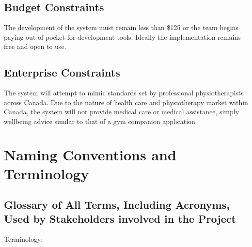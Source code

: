 \documentclass[12pt]{article}
\begin{document}
\subsection{Budget Constraints}
The development of the system must remain less than \$125 or the team begins paying out of pocket for development tools. Ideally the implementation remains free and open to use.

\subsection{Enterprise Constraints}
The system will attempt to mimic standards set by professional physiotherapists across Canada. Due to the nature of health care and physiotherapy market within Canada, the system will not provide medical care or medical assistance, simply wellbeing advice similar to that of a gym companion application.

\section{Naming Conventions and Terminology}

\subsection{Glossary of All Terms, Including Acronyms, Used by Stakeholders
involved in the Project}
Terminology:
\end{document}
